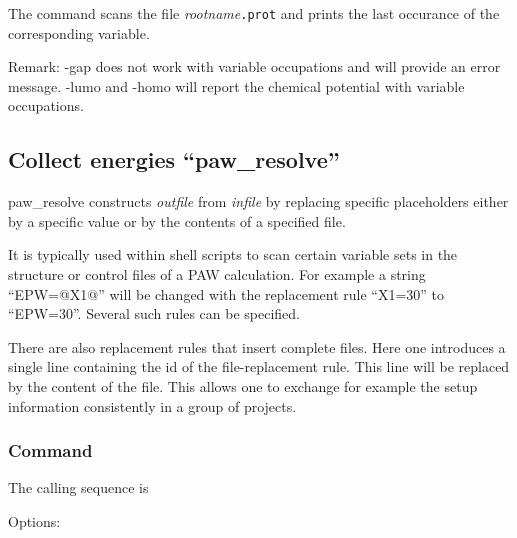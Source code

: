 \documentclass[final,12pt,makeidx,DIV=calc]{article}
\begin{document}
{{{The command scans the file \textit{rootname}\verb|.prot| and
prints the last occurance of the corresponding variable.

Remark: -gap does not work with variable occupations and will provide
an error message. -lumo and -homo will report the chemical potential
with variable occupations.
%
\subsection{Collect energies ``paw\_resolve''}
paw\_resolve constructs \textit{outfile} from \textit{infile} by
replacing specific placeholders either by a specific value or by the
contents of a specified file. 

It is typically used within shell scripts to scan certain variable
sets in the structure or control files of a PAW calculation.  For
example a string ``EPW=@X1@'' will be changed with the replacement
rule ``X1=30'' to ``EPW=30''. Several such rules can be specified.

There are also replacement rules that insert complete files. Here one
introduces a single line containing the id of the file-replacement
rule.  This line will be replaced by the content of the file. This
allows one to exchange for example the setup information consistently
in a group of projects.

\subsubsection{Command}
The calling sequence is

\bigskip{}
\vspace{0.5cm}

\noindent Options:\\[2mm]
\hspace*{1cm}
\bigskip
%
}}}
\end{document}
